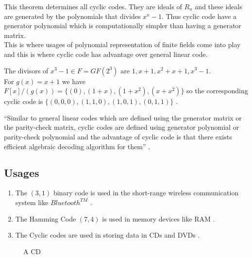\begin{tcolorbox}
  This theorem determines all cyclic codes. They are ideals of \(R_n\) and these ideals are generated by the polynomials that divides \(x^n-1\). Thus cyclic code have a generator polynomial which is computationally simpler than having a generator matrix. \\[2mm]
  This is where usages of polynomial representation of finite fields come into play and this is where cyclic code has advantage over general linear code.
\end{tcolorbox}

\vspace{5mm}
\begin{example}
  The divisors of \(x^3-1 \in F=GF(2^{3})\) are \(1, x+1, x^2+x+1, x^3-1\).\\
  For \(g(x)=x+1\) we have \(F[x]/(g(x))=\{(0),(1+x),(1+x^2),(x+x^2)\}\) so the corresponding cyclic code is \(\{(0,0,0),(1,1,0),(1,0,1),(0,1,1)\}\) \cite{error_correct}.
\end{example}

\vspace{7mm}
``Similar to general linear codes which are defined using the generator matrix or the parity-check matrix, cyclic codes are defined using generator polynomial or parity-check polynomial and the advantage of cyclic code is that there exists efficient algebraic decoding algorithm for them'' \cite{coding}.

\subsection{Usages}
\begin{enumerate}
\item The \((3,1)\) binary code is used in the short-range wireless communication system like \(Bluetooth^{TM}\) \cite{wireless}.
\item The Hamming Code \((7,4)\) is used in memory devices like RAM \cite{coding}.

  \item The Cyclic codes are used in storing data in CDs and DVDs \cite{coding}.
  \end{enumerate}
  \vspace{9mm}

  \begin{figure}[h]
    \centering
    \caption*{\footnotesize A CD}
  \end{figure}



